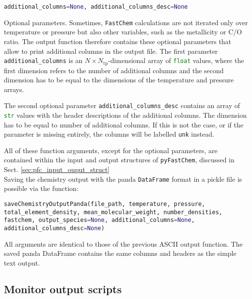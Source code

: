 \documentclass[numbers=noenddot]{fcmanual}
\newcommand{\fc}{\texttt{FastChem}\xspace}
\newcommand{\pfc}{\texttt{pyFastChem}\xspace}
\begin{document}
\bigbreak

\lstinline[language=Python]!additional_columns=None, additional_columns_desc=None!
\begin{addmargin}[25pt]{0pt}
	Optional parameters. Sometimes, \fc calculations are not iterated only over temperature or pressure but also other variables, such as the metallicity or C/O ratio. The output function therefore contains these optional parameters that allow to print additional columns in the output file. The first parameter \lstinline[language=Python]!additional_columns! is an $N\times N_\mathrm{tp}$-dimensional array of \lstinline[language=Python]!float! values, where the first dimension refers to the number of additional columns and the second dimension has to be equal to the dimensions of the temperature and pressure arrays. 
	
	The second optional parameter \lstinline[language=Python]!additional_columns_desc! contains an array of \lstinline[language=Python]!str! values with the header descriptions of the additional columns. The dimension has to be equal to number of additional columns. If this is not the case, or if the parameter is missing entirely, the columns will be labelled \texttt{unk} instead.
\end{addmargin}

\bigbreak

All of these function arguments, except for the optional parameters, are contained within the input and output structures of \pfc, discussed in Sect. \ref{sec:pfc_input_ouput_struct}\\

Saving the chemistry output with the panda \lstinline[language=Python]!DataFrame! format in a pickle file is possible via the function:

\bigbreak

\lstinline[language=Python, breaklines, breakatwhitespace]!saveChemistryOutputPanda(file_path, temperature, pressure, total_element_density, mean_molecular_weight, number_densities, fastchem, output_species=None, additional_columns=None, additional_columns_desc=None)!

\bigbreak

All arguments are identical to those of the previous ASCII output function. The saved panda DataFrame contains the same columns and headers as the simple text output.


\subsection{Monitor output scripts}
\end{document}
